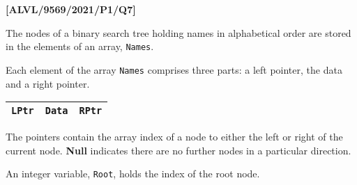 \item \textbf{{[}ALVL/9569/2021/P1/Q7{]} }

The nodes of a binary search tree holding names in alphabetical order
are stored in the elements of an array, \texttt{Names}. 

Each element of the array \texttt{Names} comprises three parts: a
left pointer, the data and a right pointer. 
\noindent \begin{center}
\texttt{}%
\begin{tabular}{|c|c|c|}
\hline 
\texttt{\textbf{LPtr}} & \texttt{\textbf{Data}} & \texttt{\textbf{RPtr}}\tabularnewline
\hline 
\end{tabular} 
\par\end{center}

The pointers contain the array index of a node to either the left
or right of the current node. \textbf{Null} indicates there are no
further nodes in a particular direction. 

An integer variable, \texttt{Root}, holds the index of the root node. 

